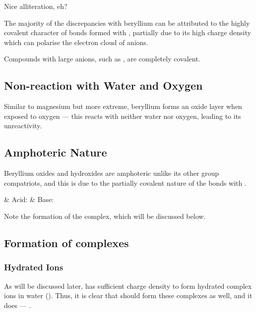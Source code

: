 		Nice alliteration, eh?

		The majority of the discrepancies with beryllium can be attributed to the highly covalent character
		of bonds formed with , partially due to its high charge density which can polarise the electron
		cloud of anions.

		Compounds with large anions, such as , are completely covalent.



		\subsection{Non-reaction with Water and Oxygen}

			Similar to magnesium but more extreme, beryllium forms an  oxide layer when
			exposed to oxygen --- this reacts with neither water nor oxygen, leading to its unreactivity.



		\subsection{Amphoteric Nature}

			Beryllium oxides and hydroxides are amphoteric unlike its other group \rtwo{} compatriots, and
			this is due to the partially covalent nature of the bonds with .

			\begin{bulletlist}
				& Acid:\tabto{15mm} 
				& Base:\tabto{15mm} 
			\end{bulletlist}

			Note the formation of the  complex, which will be discussed below.



		\subsection{Formation of  complexes}

			\subsubsection{Hydrated Ions}

				As will be discussed later,  has sufficient charge density to form hydrated complex
				ions in water (). Thus, it is clear that  should form these complexes
				as well, and it does --- .

